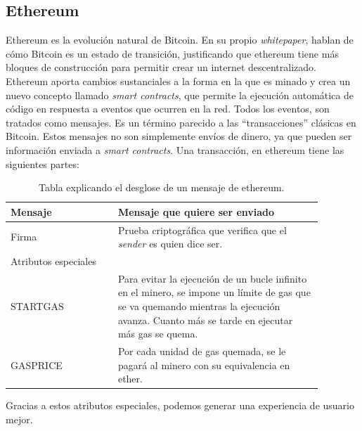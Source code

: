 \subsection{Ethereum}
Ethereum es la evolución natural de Bitcoin. En su propio \textit{whitepaper}, hablan de cómo Bitcoin es un estado de transición, justificando que ethereum tiene más bloques de construcción para permitir crear un internet descentralizado. Ethereum aporta cambios sustanciales a la forma en la que es minado y crea un nuevo concepto llamado \textit{smart contracts}, que permite la ejecución automática de código en respuesta a eventos que ocurren en la red.
Todos los eventos, son tratados como mensajes. Es un término parecido a las “transacciones” clásicas en Bitcoin. Estos mensajes no son simplemente envíos de dinero, ya que pueden ser información enviada a \textit{smart contracts}. Una transacción, en ethereum tiene las siguientes partes:
\begin{center}
    \begin{table}[h!]
        \begin{tabular}{|p{0.3\linewidth} | p{0.58\linewidth}|}
            \hline
            Mensaje & Mensaje que quiere ser enviado \\
            \hline
            Firma   & Prueba criptográfica que verifica que el \textit{sender} es quien dice ser. \\
            \hline
            Atributos especiales & \\
            \hline
            STARTGAS &  Para evitar la ejecución de un bucle infinito en el minero, se impone un límite de gas que se va quemando mientras la ejecución avanza. Cuanto más se tarde en ejecutar más gas se quema. \\
            \hline
            GASPRICE & Por cada unidad de gas quemada, se le pagará al minero con su equivalencia en ether. \\
            \hline
        \end{tabular}
        \label{tab:ethereum_msg}
        \cite{web:transaction}
        \caption{Tabla explicando el desglose de un mensaje de ethereum.}
    \end{table}
\end{center}
Gracias a estos atributos especiales, podemos generar una experiencia de usuario mejor.
